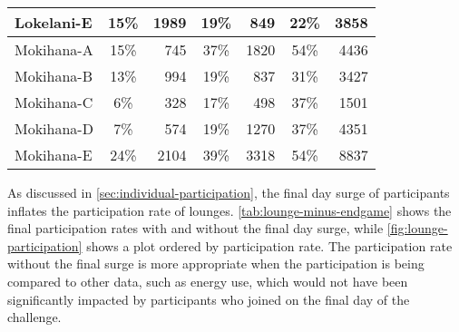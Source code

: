 \begin{table}[htbp]
\begin{tabular}{ l | c | r | c | r | c | r |}
		\multicolumn{1}{|l|}{Lokelani-E} & 15\% & 1989 & 19\% & 849 & 22\% & 3858 \\ \hline
		\multicolumn{1}{|l|}{Mokihana-A} & 15\% & 745 & 37\% & 1820 & 54\% & 4436 \\ \hline
		\multicolumn{1}{|l|}{Mokihana-B} & 13\% & 994 & 19\% & 837 & 31\% & 3427 \\ \hline
		\multicolumn{1}{|l|}{Mokihana-C} & 6\% & 328 & 17\% & 498 & 37\% & 1501 \\ \hline
		\multicolumn{1}{|l|}{Mokihana-D} & 7\% & 574 & 19\% & 1270 & 37\% & 4351 \\ \hline
		\multicolumn{1}{|l|}{Mokihana-E} & 24\% & 2104 & 39\% & 3318 & 54\% & 8837 \\ \hline
	\end{tabular}
\end{table}

As discussed in \autoref{sec:individual-participation}, the final day surge of participants inflates the participation rate of lounges. \autoref{tab:lounge-minus-endgame} shows the final participation rates with and without the final day surge, while \autoref{fig:lounge-participation} shows a plot ordered by participation rate. The participation rate without the final surge is more appropriate when the participation is being compared to other data, such as energy use, which would not have been significantly impacted by participants who joined on the final day of the challenge.

